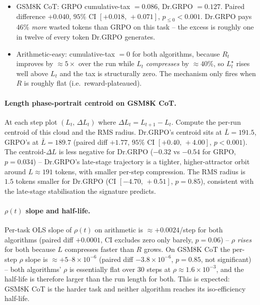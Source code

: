 \begin{itemize}
\item GSM8K CoT: GRPO cumulative-tax $= 0.086$, Dr.GRPO $= 0.127$.
      Paired difference $+0.040$, $95\%$ CI $[+0.018,\, +0.071]$,
      $p_{\le 0} < 0.001$. Dr.GRPO pays $46\%$ \emph{more} wasted
      tokens than GRPO on this task -- the excess is roughly one in
      twelve of every token Dr.GRPO generates.
\item Arithmetic-easy: cumulative-tax $= 0$ for both algorithms, because
      $R_t$ improves by $\approx 5\times$ over the run while $L_t$
      \emph{compresses} by $\approx 40\%$, so $L^\star_t$ rises well
      above $L_t$ and the tax is structurally zero. The mechanism
      only fires when $R$ is roughly flat (i.e.\ reward-plateaued).
\end{itemize}

\paragraph{Length phase-portrait centroid on GSM8K CoT.}
At each step plot $(L_t,\, \Delta L_t)$ where $\Delta L_t = L_{t+1} - L_t$.
Compute the per-run centroid of this cloud and the RMS radius. Dr.GRPO's
centroid sits at $\bar L = 191.5$, GRPO's at $\bar L = 189.7$ (paired
diff $+1.77$, $95\%$ CI $[+0.40,\, +4.00]$, $p < 0.001$). The
centroid-$\Delta L$ is less negative for Dr.GRPO ($-0.32$ vs $-0.54$
for GRPO, $p = 0.034$) -- Dr.GRPO's late-stage trajectory is a tighter,
higher-attractor orbit around $L \approx 191$ tokens, with smaller
per-step compression. The RMS radius is $1.5$ tokens smaller for
Dr.GRPO (CI $[-4.70,\, +0.51]$, $p = 0.85$), consistent with the
late-stage stabilisation the signature predicts.

\paragraph{$\rho(t)$ slope and half-life.}
Per-task OLS slope of $\rho(t)$ on arithmetic is $\approx +0.0024$/step for
both algorithms (paired diff $+0.0001$, CI excludes zero only barely,
$p = 0.06$) -- $\rho$ \emph{rises} for both because $L$ compresses
faster than $R$ grows. On GSM8K CoT the per-step $\rho$ slope is
$\approx +5$--$8 \times 10^{-6}$ (paired diff $-3.8 \times 10^{-6}$,
$p = 0.85$, not significant) -- both algorithms' $\rho$ is essentially
flat over 30 steps at $\rho \approx 1.6 \times 10^{-3}$, and the
half-life is therefore larger than the run length for both. This is
expected: GSM8K CoT is the harder task and neither algorithm reaches
its iso-efficiency half-life.


